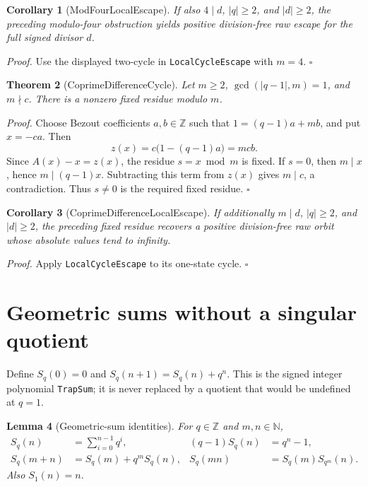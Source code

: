 \documentclass[11pt,letterpaper]{article}
\newcommand{\N}{\mathbb{N}}
\newcommand{\Z}{\mathbb{Z}}
\newtheorem{theorem}{Theorem}
\newtheorem{lemma}[theorem]{Lemma}
\newtheorem{corollary}[theorem]{Corollary}
\newenvironment{proof}{\noindent\textit{Proof.}}{\hfill\(\square\)}
\begin{document}
\begin{corollary}[ModFourLocalEscape]
If also \(4\mid d\), \(|q|\ge2\), and \(|d|\ge2\),
the preceding modulo-four obstruction yields positive division-free
raw escape for the full signed divisor \(d\).
\end{corollary}

\begin{proof}
Use the displayed two-cycle in \texttt{Local\allowbreak Cycle\allowbreak Escape} with \(m=4\).
\end{proof}

\begin{theorem}[CoprimeDifferenceCycle]
Let \(m\ge2\), \(\gcd(|q-1|,m)=1\), and \(m\nmid c\).
There is a nonzero fixed residue modulo \(m\).
\end{theorem}

\begin{proof}
Choose Bezout coefficients \(a,b\in\Z\) such that
\(1=(q-1)a+mb\), and put \(x=-ca\). Then
\[
 z(x)=c\bigl(1-(q-1)a\bigr)=mcb.
\]
Since \(A(x)-x=z(x)\), the residue \(s=x\bmod m\) is fixed.
If \(s=0\), then \(m\mid x\), hence \(m\mid(q-1)x\).
Subtracting this term from \(z(x)\) gives \(m\mid c\),
a contradiction. Thus \(s\ne0\) is the required fixed residue.
\end{proof}

\begin{corollary}[CoprimeDifferenceLocalEscape]
If additionally \(m\mid d\), \(|q|\ge2\), and \(|d|\ge2\),
the preceding fixed residue recovers a positive division-free raw orbit
whose absolute values tend to infinity.
\end{corollary}

\begin{proof}
Apply \texttt{Local\allowbreak Cycle\allowbreak Escape} to its one-state cycle.
\end{proof}

\section{Geometric sums without a singular quotient}

Define \(S_q(0)=0\) and \(S_q(n+1)=S_q(n)+q^n\).
This is the signed integer polynomial \texttt{Trap\allowbreak Sum}; it is never
replaced by a quotient that would be undefined at \(q=1\).

\begin{lemma}[Geometric-sum identities]
For \(q\in\Z\) and \(m,n\in\N\),
\begin{align*}
 S_q(n)&=\sum_{i=0}^{n-1}q^i, &
 (q-1)S_q(n)&=q^n-1,\\
 S_q(m+n)&=S_q(m)+q^mS_q(n), &
 S_q(mn)&=S_q(m)S_{q^m}(n).
\end{align*}
Also \(S_1(n)=n\).
\end{lemma}
\end{document}

